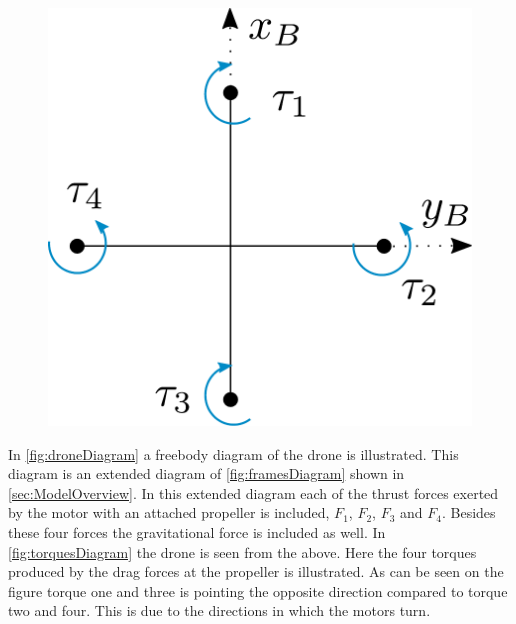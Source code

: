 \begin{minipage}{\linewidth}
\begin{minipage}{0.6\linewidth}
\begin{figure}[H]
			\label{fig:droneDiagram}
		\end{figure}
	\end{minipage}
	\hspace{0.03\linewidth}
	\begin{minipage}{0.35\linewidth}
		\begin{figure}[H] \vspace{20mm}
			\includegraphics[scale=.4]{figures/torquesDiagram}
			\centering
            \vspace{10mm}
			\label{fig:torquesDiagram}
		\end{figure}
	\end{minipage}
\end{minipage}
%
In \autoref{fig:droneDiagram} a freebody diagram of the drone is illustrated. This diagram is an extended diagram of \autoref{fig:framesDiagram} shown in \autoref{sec:ModelOverview}. In this extended diagram each of the thrust forces exerted by the motor with an attached propeller is included, $F_1$, $F_2$, $F_3$ and $F_4$. Besides these four forces the gravitational force is included as well. In \autoref{fig:torquesDiagram} the drone is seen from the above. Here the four torques produced by the drag forces at the propeller is illustrated. As can be seen on the figure torque one and three is pointing the opposite direction compared to torque two and four. This is due to the directions in which the motors turn.  

